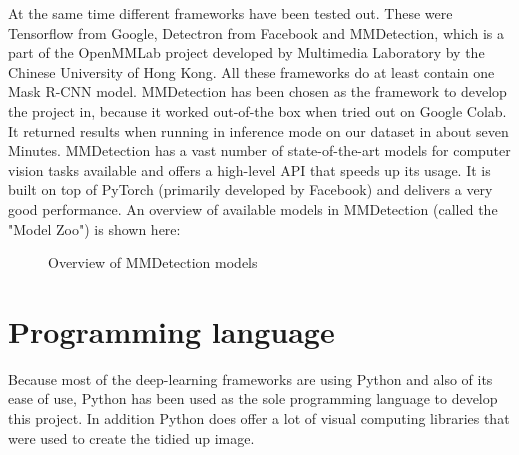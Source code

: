 At the same time different frameworks have been tested out. These were Tensorflow from Google, Detectron from Facebook and MMDetection, which is a part of the OpenMMLab project developed by Multimedia Laboratory by the Chinese University of Hong Kong. All these frameworks do at least contain one Mask R-CNN model. MMDetection has been chosen as the framework to develop the project in, because it worked out-of-the box when tried out on Google Colab. It returned results when running in inference mode on our dataset in about seven Minutes. MMDetection has a vast number of state-of-the-art models for computer vision tasks available and offers a high-level API that speeds up its usage. It is built on top of PyTorch (primarily developed by Facebook) and delivers a very good performance. An overview of available models in MMDetection (called the "Model Zoo") is shown here:

\begin{figure}[H]
	\caption{\label{fig:mmdetection-models} Overview of MMDetection models}
\end{figure}

\section{Programming language}

Because most of the deep-learning frameworks are using Python and also of its ease of use, Python has been used as the sole programming language to develop this project. In addition Python does offer a lot of visual computing libraries that were used to create the tidied up image.

